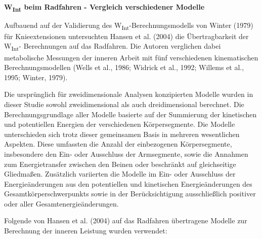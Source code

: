 \documentclass[
  letterpaper,
  DIV=11]{scrartcl}
\makeatletter
\let\oldparagraph\paragraph
\renewcommand{\paragraph}{
    \@ifstar
      \xxxParagraphStar
      \xxxParagraphNoStar
  }
\newcommand{\xxxParagraphStar}[1]{\oldparagraph*{#1}\mbox{}}
\newcommand{\xxxParagraphNoStar}[1]{\oldparagraph{#1}\mbox{}}
\makeatother
\begin{document}
\begin{tcolorbox}
\begin{figure}[H]
\end{figure}%

\end{tcolorbox}

\paragraph{\texorpdfstring{\textbf{W\textsubscript{Int} beim Radfahren -
Vergleich verschiedener
Modelle}}{WInt beim Radfahren - Vergleich verschiedener Modelle}}\label{wint-beim-radfahren---vergleich-verschiedener-modelle}

Aufbauend auf der Validierung des
W\textsubscript{Int}-Berechnungsmodells von Winter (1979) für
Knieextensionen untersuchten Hansen et al. (2004) die Übertragbarkeit
der W\textsubscript{Int}- Berechnungen auf das Radfahren. Die Autoren
verglichen dabei metabolische Messungen der inneren Arbeit mit fünf
verschiedenen kinematischen Berechnungsmodellen (Wells et al., 1986;
Widrick et al., 1992; Willems et al., 1995; Winter, 1979).

Die ursprünglich für zweidimensionale Analysen konzipierten Modelle
wurden in dieser Studie sowohl zweidimensional als auch dreidimensional
berechnet. Die Berechnungsgrundlage aller Modelle basierte auf der
Summierung der kinetischen und potentiellen Energien der verschiedenen
Körpersegmente. Die Modelle unterschieden sich trotz dieser gemeinsamen
Basis in mehreren wesentlichen Aspekten. Diese umfassten die Anzahl der
einbezogenen Körpersegmente, insbesondere den Ein- oder Ausschluss der
Armsegmente, sowie die Annahmen zum Energietransfer zwischen den Beinen
oder beschränkt auf gleichseitige Gliedmaßen. Zusätzlich variierten die
Modelle im Ein- oder Ausschluss der Energieänderungen aus den
potentiellen und kinetischen Energieänderungen des
Gesamtkörperschwerpunkts sowie in der Berücksichtigung ausschließlich
positiver oder aller Gesamtenergieänderungen.

Folgende von Hansen et al. (2004) auf das Radfahren übertragene Modelle
zur Berechnung der inneren Leistung wurden verwendet:
\end{document}
